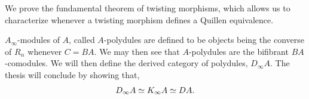 \documentclass[../thesis.tex]{subfiles}
\begin{document}
            \begin{center}
            \end{center}

            We prove the fundamental theorem of twisting morphisms, which allows us to characterize whenever a twisting morphism defines a Quillen equivalence.

            $A_\infty$-modules of $A$, called $A$-polydules are defined to be objects being the converse of $R_\alpha$ whenever $C = BA$. We may then see that $A$-polydules are the bifibrant $BA$-comodules. We will then define the derived category of polydules, $D_\infty A$. The thesis will conclude by showing that,
            \begin{align*}
                D_\infty A \simeq K_\infty A \simeq DA\tt{.}
            \end{align*}
\end{document}

